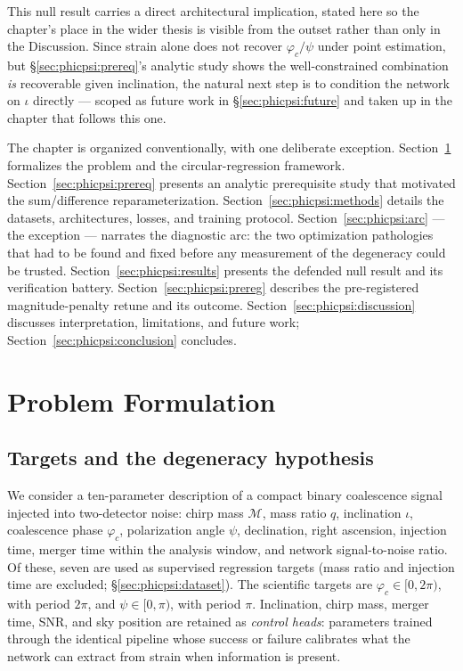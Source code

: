 This null result carries a direct architectural implication, stated here so the chapter's place in the wider thesis is visible from the outset rather than only in the Discussion.
Since strain alone does not recover $\varphi_c/\psi$ under point estimation, but \S\ref{sec:phicpsi:prereq}'s analytic study shows the well-constrained combination \emph{is} recoverable given inclination, the natural next step is to condition the network on $\iota$ directly --- scoped as future work in \S\ref{sec:phicpsi:future} and taken up in the chapter that follows this one.

The chapter is organized conventionally, with one deliberate exception.
Section~\ref{sec:phicpsi:problem} formalizes the problem and the circular-regression framework.
Section~\ref{sec:phicpsi:prereq} presents an analytic prerequisite study that motivated the sum/difference reparameterization.
Section~\ref{sec:phicpsi:methods} details the datasets, architectures, losses, and training protocol.
Section~\ref{sec:phicpsi:arc} --- the exception --- narrates the diagnostic arc: the two optimization pathologies that had to be found and fixed before any measurement of the degeneracy could be trusted.
Section~\ref{sec:phicpsi:results} presents the defended null result and its verification battery.
Section~\ref{sec:phicpsi:prereg} describes the pre-registered magnitude-penalty retune and its outcome.
Section~\ref{sec:phicpsi:discussion} discusses interpretation, limitations, and future work; Section~\ref{sec:phicpsi:conclusion} concludes.


\section{Problem Formulation}
\label{sec:phicpsi:problem}

\subsection{Targets and the degeneracy hypothesis}
\label{subsec:targets-and-the-degeneracy-hypothesis}

We consider a ten-parameter description of a compact binary coalescence signal injected into two-detector noise: chirp mass $\mathcal{M}$, mass ratio $q$, inclination $\iota$, coalescence phase $\varphi_c$, polarization angle $\psi$, declination, right ascension, injection time, merger time within the analysis window, and network signal-to-noise ratio.
Of these, seven are used as supervised regression targets (mass ratio and injection time are excluded; \S\ref{sec:phicpsi:dataset}).
The scientific targets are $\varphi_c \in [0, 2\pi)$, with period $2\pi$, and $\psi \in [0, \pi)$, with period $\pi$.
Inclination, chirp mass, merger time, SNR, and sky position are retained as \emph{control heads}: parameters trained through the identical pipeline whose success or failure calibrates what the network can extract from strain when information is present.

